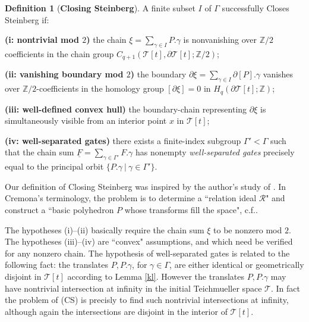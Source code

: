 \documentclass[12pt]{amsart}
\theoremstyle{definition}
\newtheorem{dfn}[thm]{Definition}
\theoremstyle{remark}
\newcommand{\bZ}{\mathbb{Z}}
\newcommand{\del}{\partial}
\newcommand{\uF}{\underline{F}}
\newcommand{\sT}{\mathscr{T}}
\begin{document}
\begin{dfn}[\textbf{Closing Steinberg}]\label{cs}
A finite subset $I$ of $\Gamma$ successfully Closes Steinberg if: 

\textbf{(i: nontrivial mod $2$)} the chain $\xi=\sum_{\gamma\in I} P.\gamma $ is nonvanishing over $\bZ/2$ coefficients in the chain group $C_{q+1}(\sT[t],\del \sT[t];\bZ/2)$;  

\textbf{(ii: vanishing boundary mod $2$)} the boundary $\del \xi=\sum_{\gamma\in I} \del [P].\gamma $
vanishes over $\bZ/2$-coefficients in the homology group $[\del \xi]=0$ in $H_q(\del \sT[t]; \bZ)$;

\textbf{(iii: well-defined convex hull)} the boundary-chain representing $\del \xi$ is simultaneously visible from an interior point $x$ in $\sT[t]$;

\textbf{(iv: well-separated gates)} there exists a finite-index subgroup $\Gamma' < \Gamma$ such that the chain sum $\uF=\sum_{\gamma \in \Gamma'}F.\gamma$ has nonempty \emph{well-separated gates} precisely equal to the principal orbit $\{P.\gamma ~|~ \gamma\in \Gamma'\}$. 
\end{dfn}

Our definition of Closing Steinberg was inspired by the author's study of \cite{Cremona}. In Cremona's terminology, the problem is to determine a ``relation ideal $\mathscr{R}$" and construct a ``basic polyhedron $P$ whose transforms fill the space", c.f.\cite[pp.290]{Cremona}. 


The hypotheses (i)--(ii) basically require the chain sum $\xi$ to be nonzero mod $2$. The hypotheses (iii)--(iv) are ``convex" assumptions, and which need be verified for any nonzero chain. The hypothesis of well-separated gates is related to the following fact: the translates $P, P.\gamma$, for $\gamma\in \Gamma$, are either identical or geometrically disjoint in $\sT[t]$ according to Lemma \ref{kl}. However the translates $P, P.\gamma$ may have nontrivial intersection at infinity in the initial Teichmueller space $\sT$. In fact the problem of (CS) is precisly to find such nontrivial intersections at infinity, although again the intersections are disjoint in the interior of $\sT[t]$.

\end{document}
